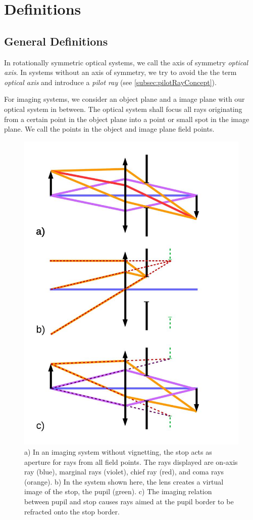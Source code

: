 \documentclass[12pt,a4paper,twoside,openright,BCOR10mm,headsepline,titlepage,abstracton,chapterprefix,final]{scrreprt}
\begin{document}
\section{Definitions}

\subsection{General Definitions}
In rotationally symmetric optical systems, we call the axis of symmetry \emph{optical axis}. 
In systems without an axis of symmetry, we try to avoid the the term \emph{optical axis}
and introduce a \emph{pilot ray} (see \ref{subsec:pilotRayConcept}).

For imaging systems, we consider an object plane and a image plane with our optical system in between. 
The optical system shall focus all rays originating from a certain point in the object plane into a point or small spot in the image plane.
We call the points in the object and image plane field points.

\begin{figure}
  \centering
   \includegraphics[width=0.5\columnwidth]{pupil}
  \caption{a) In an imaging system without vignetting, the stop acts as aperture for rays from all field points. The rays displayed are on-axis ray (blue), marginal rays (violet), chief ray (red), and coma rays (orange).
  b) In the system shown here, the lens creates a virtual image of the stop, the pupil (green).
  c) The imaging relation between pupil and stop causes rays aimed at the pupil border to be refracted onto the stop border.
  }
  \label{fig:pupil}
\end{figure}
\end{document}
